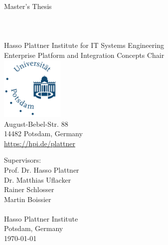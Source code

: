 \begin{titlepage}

\thispagestyle{empty}
\begin{center}
	\LARGE
	Master's Thesis\\
	\vspace{0.4cm}
	\Huge
    \TITLE{}\\
	\vspace{0.4cm}
	\large
	\vspace{0.5cm}
	\LARGE
	\textbf{\AUTHOR}\\
	\normalsize
  \Mail{\EMAIL}\\
	\vspace{0.4cm}
	\small
	Hasso Plattner Institute for IT Systems Engineering\\
	Enterprise Platform and Integration Concepts Chair\\
	\vspace{0.3cm}
	\hspace{1cm}
	\includegraphics[width=3cm]{figures/Universitaet_Potsdam_logo}\\
	\vspace{0.1cm}
	August-Bebel-Str. 88\\
	14482 Potsdam, Germany\\
	\url{https://hpi.de/plattner}\\
\end{center}
Supervisors:
\vspace{0.3cm}\\
Prof. Dr. Hasso Plattner\\
Dr. Matthias Uflacker\\
Rainer Schlosser\\
Martin Boissier\\
\vspace{0.3cm}\\
Hasso Plattner Institute\\
Potsdam, Germany
\vspace{0.4cm}\\
\today
\end{titlepage}

